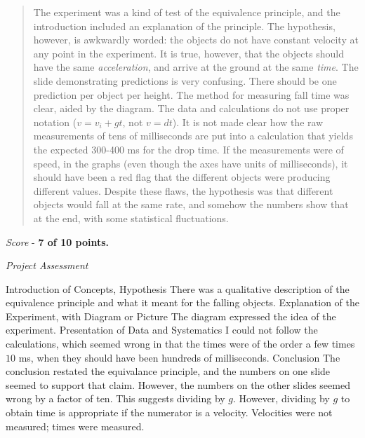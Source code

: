 \documentclass[10pt]{article}
\begin{document}
\maketitle

\begin{abstract}
The experiment was a kind of test of the equivalence principle, and the introduction included an explanation of the principle.  The hypothesis, however, is awkwardly worded: the objects do not have constant velocity at any point in the experiment.  It is true, however, that the objects should have the same \textit{acceleration}, and arrive at the ground at the same \textit{time}.  The slide demonstrating predictions is very confusing.  There should be one prediction per object per height.  The method for measuring fall time was clear, aided by the diagram.  The data and calculations do not use proper notation ($v = v_i + gt$, not $v = d t$).  It is not made clear how the raw measurements of tens of milliseconds are put into a calculation that yields the expected 300-400 ms for the drop time.  If the measurements were of speed, in the graphs (even though the axes have units of milliseconds), it should have been a red flag that the different objects were producing different values.  Despite these flaws, the hypothesis was that different objects would fall at the same rate, and somehow the numbers show that at the end, with some statistical fluctuations.
\end{abstract}

\textit{Score} - \textbf{7 of 10 points.}

\textit{Project Assessment}
\begin{outline}[enumerate]
\1 Introduction of Concepts, Hypothesis
\2 There was a qualitative description of the equivalence principle and what it meant for the falling objects.
\1 Explanation of the Experiment, with Diagram or Picture
\2 The diagram expressed the idea of the experiment.
\1 Presentation of Data and Systematics
\2 I could not follow the calculations, which seemed wrong in that the times were of the order a few times $10$ ms, when they should have been hundreds of milliseconds.
\1 Conclusion
\2 The conclusion restated the equivalance principle, and the numbers on one slide seemed to support that claim.  However, the numbers on the other slides seemed wrong by a factor of ten.  This suggests dividing by $g$.  However, dividing by $g$ to obtain time is appropriate if the numerator is a velocity.  Velocities were not measured; times were measured.
\end{outline}
\end{document}
